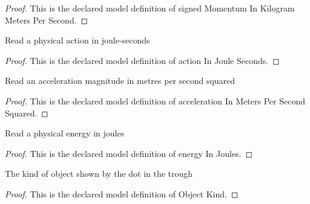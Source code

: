 \begin{proof}
  This is the declared model definition of signed Momentum In Kilogram Meters Per Second.
\end{proof}
\begin{definition}
  \label{def:physics:phyx-mini-0654:phyxminiproblems-problemphyxmini0654-actioninjouleseconds}
  Read a physical action in joule-seconds
\end{definition}
\begin{proof}
  This is the declared model definition of action In Joule Seconds.
\end{proof}
\begin{definition}
  \label{def:physics:phyx-mini-0654:phyxminiproblems-problemphyxmini0654-accelerationinmeterspersecondsquared}
  Read an acceleration magnitude in metres per second squared
\end{definition}
\begin{proof}
  This is the declared model definition of acceleration In Meters Per Second Squared.
\end{proof}
\begin{definition}
  \label{def:physics:phyx-mini-0654:phyxminiproblems-problemphyxmini0654-energyinjoules}
  Read a physical energy in joules
\end{definition}
\begin{proof}
  This is the declared model definition of energy In Joules.
\end{proof}
\begin{definition}
  \label{def:physics:phyx-mini-0654:phyxminiproblems-problemphyxmini0654-objectkind}
  The kind of object shown by the dot in the trough
\end{definition}
\begin{proof}
  This is the declared model definition of Object Kind.
\end{proof}
